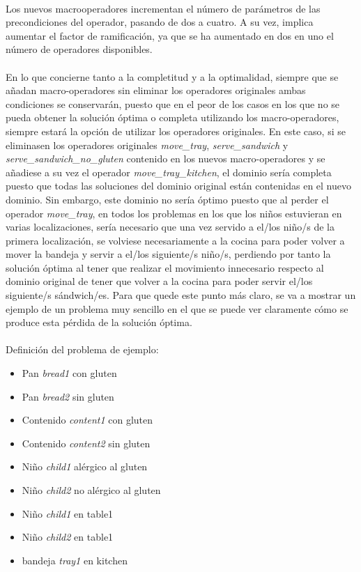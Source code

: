 \documentclass{article}
\begin{document}
\paragraph{}
Los nuevos macrooperadores incrementan el número de parámetros de las
precondiciones del operador, pasando de dos a cuatro. A su vez, implica
aumentar el factor de ramificación, ya que se ha aumentado en dos en uno el número de
operadores disponibles.

\paragraph{}
En lo que concierne tanto a la completitud y a la optimalidad, siempre que se
añadan macro-operadores sin eliminar los operadores originales ambas
condiciones se conservarán, puesto que en el peor de los casos en los que no se pueda
obtener la solución óptima o completa utilizando los macro-operadores, siempre
estará la opción de utilizar los operadores originales. En este caso, si se eliminasen
los operadores originales \textit{move\_tray}, \textit{serve\_sandwich} y \textit{serve\_sandwich\_no\_gluten}
contenido en los nuevos macro-operadores y se añadiese a su vez el operador
\textit{move\_tray\_kitchen}, el dominio sería completa puesto que todas las soluciones
del dominio original están contenidas en el nuevo dominio. Sin embargo, este
dominio no sería óptimo puesto que al perder el operador \textit{move\_tray}, en todos
los problemas en los que los niños estuvieran en varias localizaciones, sería
necesario que una vez servido a el/los niño/s de la primera localización, se volviese
necesariamente a la cocina para poder volver a mover la bandeja y servir a el/los
siguiente/s niño/s, perdiendo por tanto la solución óptima al tener que realizar
el movimiento innecesario respecto al dominio original de tener que volver a la
cocina para poder servir el/los siguiente/s sándwich/es. Para que quede este
punto más claro, se va a mostrar un ejemplo de un problema muy sencillo en
el que se puede ver claramente cómo se produce esta pérdida de la solución
óptima.

\paragraph{}
Definición del problema de ejemplo:
\begin{itemize}
    \item Pan \textit{bread1} con gluten
    \item Pan \textit{bread2} sin gluten
    \item Contenido \textit{content1} con gluten
    \item Contenido \textit{content2} sin gluten
    \item Niño \textit{child1} alérgico al gluten
    \item Niño \textit{child2} no alérgico al gluten
    \item Niño \textit{child1} en table1
    \item Niño \textit{child2} en table1
    \item bandeja \textit{tray1} en kitchen
\end{itemize}
\end{document}
